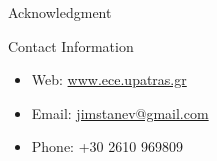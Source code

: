 \documentclass[final]{beamer}
\newlength{\onecolwid}
\begin{document}
\begin{frame}[t]
\begin{columns}[t]
\begin{column}{\onecolwid}
\begin{block}{Acknowledgment}
\end{block}




\begin{alertblock}{Contact Information}
	
	\begin{itemize}
		\item Web: \href{www.ece.upatras.gr}{www.ece.upatras.gr}
		\item Email: \href{mailto:jimstanev@gmail.com}{jimstanev@gmail.com}
		\item Phone: +30 2610 969809
	\end{itemize}
	
\end{alertblock}

\end{column} %


\end{columns} %

\end{frame} %
\end{document}
